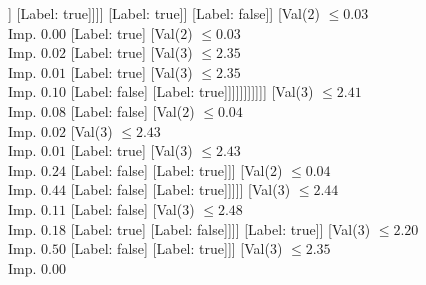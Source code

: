 \documentclass[margin=10pt]{standalone}
\begin{document}
\begin{forest}
																[Label: false]
																[Val($3$) $ \leq 2.25$ \\ Imp. $0.00$
																	[Val($3$) $ \leq 2.24$ \\ Imp. $0.02$
																		[Val($2$) $ \leq 0.03$ \\ Imp. $0.01$
																			[Val($3$) $ \leq 2.20$ \\ Imp. $0.02$
																				[Label: true]
																				[Val($3$) $ \leq 2.20$ \\ Imp. $0.14$
																					[Label: false]
																					[Val($2$) $ \leq 0.03$ \\ Imp. $0.05$
																						[Val($3$) $ \leq 2.21$ \\ Imp. $0.44$
																							[Label: true]
																							[Label: false]]
																						[Label: true]]]]
																			[Label: true]]
																		[Label: false]]
																	[Val($2$) $ \leq 0.03$ \\ Imp. $0.00$
																		[Label: true]
																		[Val($2$) $ \leq 0.03$ \\ Imp. $0.02$
																			[Label: true]
																			[Val($3$) $ \leq 2.35$ \\ Imp. $0.01$
																				[Label: true]
																				[Val($3$) $ \leq 2.35$ \\ Imp. $0.10$
																					[Label: false]
																					[Label: true]]]]]]]]]]]
											[Val($3$) $ \leq 2.41$ \\ Imp. $0.08$
												[Label: false]
												[Val($2$) $ \leq 0.04$ \\ Imp. $0.02$
													[Val($3$) $ \leq 2.43$ \\ Imp. $0.01$
														[Label: true]
														[Val($3$) $ \leq 2.43$ \\ Imp. $0.24$
															[Label: false]
															[Label: true]]]
													[Val($2$) $ \leq 0.04$ \\ Imp. $0.44$
														[Label: false]
														[Label: true]]]]]
										[Val($3$) $ \leq 2.44$ \\ Imp. $0.11$
											[Label: false]
											[Val($3$) $ \leq 2.48$ \\ Imp. $0.18$
												[Label: true]
												[Label: false]]]]
									[Label: true]]
								[Val($3$) $ \leq 2.20$ \\ Imp. $0.50$
									[Label: false]
									[Label: true]]]
							[Val($3$) $ \leq 2.35$ \\ Imp. $0.00$

\end{forest}
\end{document}
